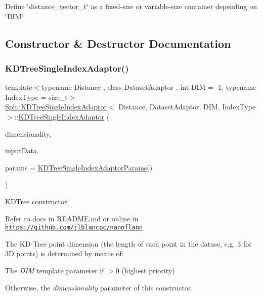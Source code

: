Define \char`\"{}distance\+\_\+vector\+\_\+t\char`\"{} as a fixed-\/size or variable-\/size container depending on \char`\"{}\+D\+I\+M\char`\"{} 

\subsection{Constructor \& Destructor Documentation}
\hypertarget{classSph_1_1KDTreeSingleIndexAdaptor_a095fe85253e99a45f533ac830b7f69c3}{}\label{classSph_1_1KDTreeSingleIndexAdaptor_a095fe85253e99a45f533ac830b7f69c3} 
\subsubsection{\texorpdfstring{K\+D\+Tree\+Single\+Index\+Adaptor()}{KDTreeSingleIndexAdaptor()}}
{\footnotesize\ttfamily template$<$typename Distance , class Dataset\+Adaptor , int D\+IM = -\/1, typename Index\+Type  = size\+\_\+t$>$ \\
\hyperlink{classSph_1_1KDTreeSingleIndexAdaptor}{Sph\+::\+K\+D\+Tree\+Single\+Index\+Adaptor}$<$ Distance, Dataset\+Adaptor, D\+IM, Index\+Type $>$\+::\hyperlink{classSph_1_1KDTreeSingleIndexAdaptor}{K\+D\+Tree\+Single\+Index\+Adaptor} (\begin{DoxyParamCaption}\item[{const int}]{dimensionality,  }\item[{const Dataset\+Adaptor \&}]{input\+Data,  }\item[{const \hyperlink{structSph_1_1KDTreeSingleIndexAdaptorParams}{K\+D\+Tree\+Single\+Index\+Adaptor\+Params} \&}]{params = {\ttfamily \hyperlink{structSph_1_1KDTreeSingleIndexAdaptorParams}{K\+D\+Tree\+Single\+Index\+Adaptor\+Params}()} }\end{DoxyParamCaption})\hspace{0.3cm}{\ttfamily [inline]}}

K\+D\+Tree constructor

Refer to docs in R\+E\+A\+D\+M\+E.\+md or online in \href{https://github.com/jlblancoc/nanoflann}{\tt https\+://github.\+com/jlblancoc/nanoflann}

The K\+D-\/\+Tree point dimension (the length of each point in the datase, e.\+g. 3 for 3D points) is determined by means of\+:
\begin{DoxyItemize}
\item The {\itshape D\+IM} template parameter if $>$0 (highest priority)
\item Otherwise, the {\itshape dimensionality} parameter of this constructor.
\end{DoxyItemize}



